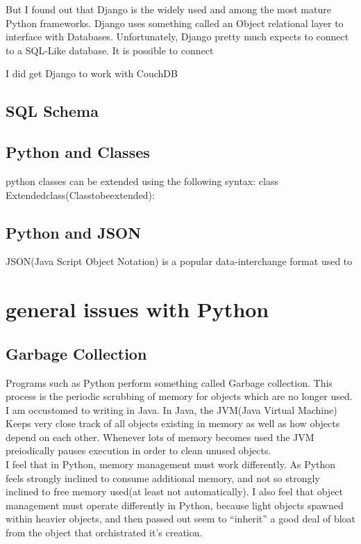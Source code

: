 But I found out that Django is the widely used and among the most mature Python frameworks.  Django uses something called an Object relational layer to interface with Databases.  Unfortunately, Django pretty much expects to connect to a SQL-Like database.  It is possible to connect 

I did get Django to work with CouchDB


\subsection{SQL Schema}



\subsection{Python and Classes}

python classes can be extended using the following syntax:
    class Extendedclass(Classtobeextended):

\subsection{Python and JSON}
JSON(Java Script Object Notation) is a popular data-interchange format used to


\section{general issues with Python}

\subsection{Garbage Collection}

Programs such as Python perform something called Garbage collection.  This process is the periodic scrubbing of memory for objects which are no longer used.\\
I am occustomed to writing in Java.  In Java, the JVM(Java Virtual Machine) Keeps very close track of all objects existing in memory as well as how objects depend on each other.  Whenever lots of memory becomes used the JVM preiodically pauses execution in order to clean unused objects.\\
I feel that in Python, memory management must work differently.  As Python feels strongly inclined to consume additional memory, and not so strongly inclined to free memory used(at least not automatically).  I also feel that object management must operate differently in Python, because light objects spawned within heavier objects, and then passed out seem to ``inherit'' a good deal of bloat from the object that orchistrated it's creation.



